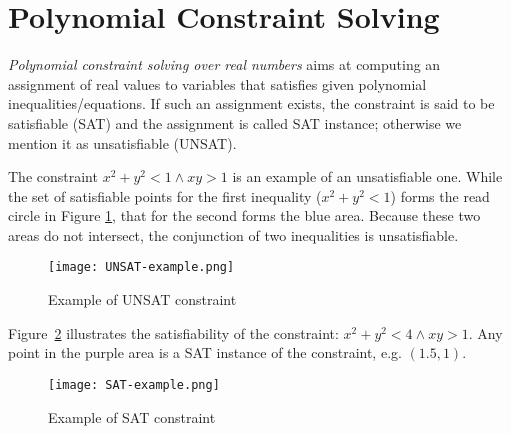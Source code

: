 \section{Polynomial Constraint Solving}
{\em Polynomial constraint solving over real numbers} aims at computing an assignment of real values to variables
that satisfies given polynomial inequalities/equations. If such an assignment exists, the constraint is said to be satisfiable (SAT) and the assignment is called SAT instance; otherwise we mention it as unsatisfiable (UNSAT). 
\begin{example} \label{examp:unsat-example}
The constraint $x^2 + y^2 < 1 \wedge xy > 1$ is an example of an unsatisfiable one. While the set of satisfiable points for the first inequality ($x^2 + y^2 < 1$) forms the read circle in Figure \ref{fig:unsat-example}, that for the second forms the blue area. Because these two areas do not intersect, the conjunction of two inequalities is unsatisfiable.
\end{example}

\begin{figure}[ht]
\centering
\texttt{[image: UNSAT-example.png]} 
\caption{Example of UNSAT constraint} 
\label{fig:unsat-example} 
\end{figure} 

\begin{example} \label{examp:sat-example} \sloppy
Figure~\ref{fig:sat-example} illustrates the satisfiability of the constraint: ${x^2 + y^2 < 4 \wedge xy > 1}$. Any point in the purple area is a SAT instance of the constraint, e.g. $(1.5, 1)$.
\end{example}

\begin{figure}[ht]
\centering
\texttt{[image: SAT-example.png]} 
\caption{Example of SAT constraint} 
\label{fig:sat-example} 
\end{figure} 

%	

